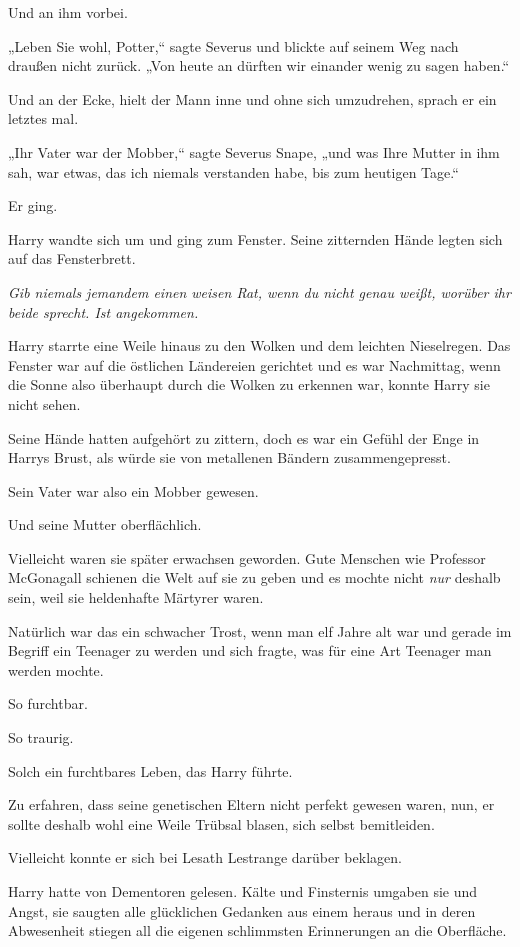 {Und an ihm vorbei.

„Leben Sie wohl, Potter,“ sagte Severus und blickte auf seinem Weg nach draußen nicht zurück. „Von heute an dürften wir einander wenig zu sagen haben.“

Und an der Ecke, hielt der Mann inne und ohne sich umzudrehen, sprach er ein letztes mal.

„Ihr Vater war der Mobber,“ sagte Severus Snape, „und was Ihre Mutter in ihm sah, war etwas, das ich niemals verstanden habe, bis zum heutigen Tage.“

Er ging.

Harry wandte sich um und ging zum Fenster. Seine zitternden Hände legten sich auf das Fensterbrett.

\emph{Gib niemals jemandem einen weisen Rat, wenn du nicht genau weißt, worüber ihr beide sprecht. Ist angekommen.}

Harry starrte eine Weile hinaus zu den Wolken und dem leichten Nieselregen. Das Fenster war auf die östlichen Ländereien gerichtet und es war Nachmittag, wenn die Sonne also überhaupt durch die Wolken zu erkennen war, konnte Harry sie nicht sehen.

Seine Hände hatten aufgehört zu zittern, doch es war ein Gefühl der Enge in Harrys Brust, als würde sie von metallenen Bändern zusammengepresst.

Sein Vater war also ein Mobber gewesen.

Und seine Mutter oberflächlich.

Vielleicht waren sie später erwachsen geworden. Gute Menschen wie Professor McGonagall schienen die Welt auf sie zu geben und es mochte nicht \emph{nur} deshalb sein, weil sie heldenhafte Märtyrer waren.

Natürlich war das ein schwacher Trost, wenn man elf Jahre alt war und gerade im Begriff ein Teenager zu werden und sich fragte, was für eine Art Teenager man werden mochte.

So furchtbar.

So traurig.

Solch ein furchtbares Leben, das Harry führte.

Zu erfahren, dass seine genetischen Eltern nicht perfekt gewesen waren, nun, er sollte deshalb wohl eine Weile Trübsal blasen, sich selbst bemitleiden.

Vielleicht konnte er sich bei Lesath Lestrange darüber beklagen.

Harry hatte von Dementoren gelesen. Kälte und Finsternis umgaben sie und Angst, sie saugten alle glücklichen Gedanken aus einem heraus und in deren Abwesenheit stiegen all die eigenen schlimmsten Erinnerungen an die Oberfläche.

}
